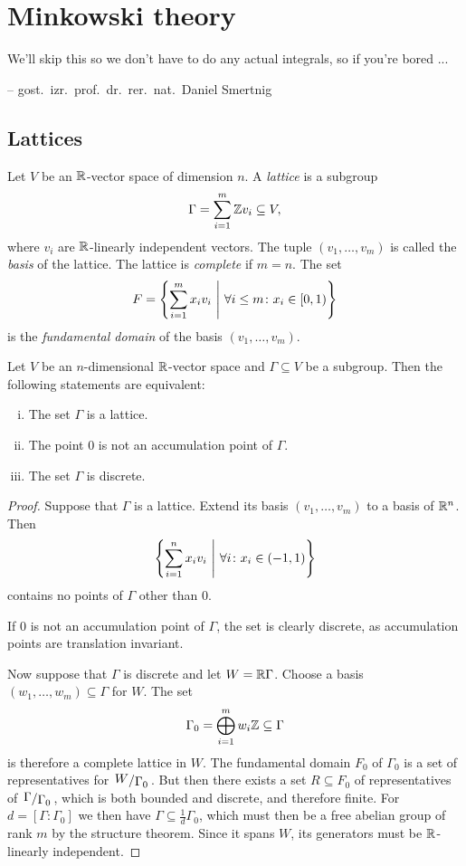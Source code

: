 \section{Minkowski theory}

\epigraph{We'll skip this so we don't have to do any actual
integrals, so if you're bored ...}
{-- gost.~izr.~prof.~dr.~rer.~nat.~Daniel Smertnig}

\subsection{Lattices}

\begin{definicija}
Let $V$ be an $\mathbb{R}$-vector space of dimension $n$. A
\emph{lattice} is a subgroup
\[
\Gamma = \sum_{i=1}^m \mathbb{Z} v_i \subseteq V,
\]
where $v_i$ are $\mathbb{R}$-linearly independent vectors. The tuple
$(v_1, \dots, v_m)$ is called the \emph{basis} of the
lattice. The lattice is \emph{complete} if
$m = n$. The set
\[
F =
\left\{\sum_{i=1}^m x_i v_i~\middle\vert~\forall i \leq m \colon x_i \in [0, 1)\right\}
\]
is the \emph{fundamental domain} of the
basis $(v_1, \dots, v_m)$.
\end{definicija}

\begin{trditev}
Let $V$ be an $n$-dimensional $\mathbb{R}$-vector space and
$\Gamma \subseteq V$ be a subgroup. Then the following statements
are equivalent:

\begin{enumerate}[i)]
\item The set $\Gamma$ is a lattice.
\item The point $0$ is not an accumulation point of $\Gamma$.
\item The set $\Gamma$ is discrete.
\end{enumerate}
\end{trditev}

\begin{proof}
Suppose that $\Gamma$ is a lattice. Extend its basis
$(v_1, \dots, v_m)$ to a basis of $\mathbb{R}^n$. Then
\[
\left\{\sum_{i=1}^n x_i v_i~\middle\vert~\forall i \colon x_i \in (-1,1)\right\}
\]
contains no points of $\Gamma$ other than $0$.

If $0$ is not an accumulation point of $\Gamma$, the set is clearly
discrete, as accumulation points are translation invariant.

Now suppose that $\Gamma$ is discrete and let $W = \mathbb{R} \Gamma$.
Choose a basis $(w_1, \dots, w_m) \subseteq \Gamma$ for $W$. The
set
\[
\Gamma_0 = \bigoplus_{i=1}^m w_i \mathbb{Z} \subseteq \Gamma
\]
is therefore a complete lattice in $W$. The fundamental domain
$F_0$ of $\Gamma_0$ is a set of representatives for
$\kvoc{W}{\Gamma_0}$. But then there exists a set $R \subseteq F_0$
of representatives of $\kvoc{\Gamma}{\Gamma_0}$, which is both
bounded and discrete, and therefore finite. For
$d = [\Gamma : \Gamma_0]$ we then have
$\Gamma \subseteq \frac{1}{d} \Gamma_0$, which must then be a free
abelian group of rank $m$ by the structure theorem. Since it spans
$W$, its generators must be $\mathbb{R}$-linearly independent.
\end{proof}


